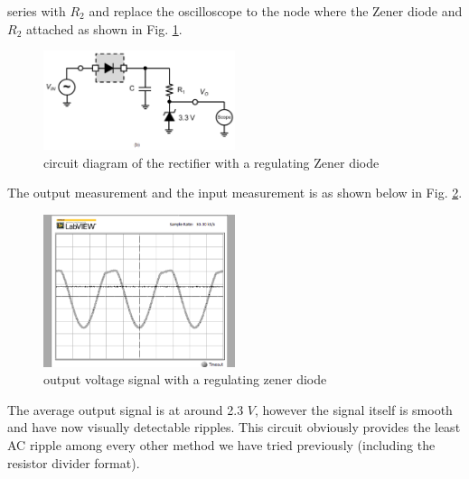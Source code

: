 \documentclass[letterpaper, 10 pt, conference]{ieeeconf}  %
\begin{document}
series with $R_{2}$ and replace the oscilloscope to the node where the Zener diode
and $R_{2}$ attached as shown in Fig. \ref{fig:5.3}.
\begin{figure}[ht]
  \centering
  \includegraphics[width=0.5\textwidth]{images/5_3.png}
  \caption{circuit diagram of the rectifier with a regulating Zener diode}
  \label{fig:5.3}
\end{figure}
\par The output measurement and the input measurement is as shown below in Fig. \ref{fig:5.4}.
\begin{figure}[ht]
  \centering
  \includegraphics[width=0.5\textwidth]{images/5_4.png}
  \caption{output voltage signal with a regulating zener diode}
  \label{fig:5.4}
\end{figure}
\par The average output signal is at around 2.3 $V$, however the signal itself
is smooth and have now visually detectable ripples. This circuit obviously
provides the least AC ripple among every other method we have tried previously
(including the resistor divider format).
\clearpage
\end{document}

